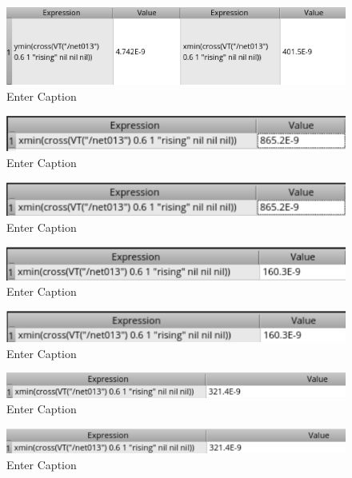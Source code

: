 \documentclass[12pt]{article}
\begin{document}
\begin{figure}[H]
    \centering
    \includegraphics[width=0.5\linewidth]{writeup//figures/wbuf1.png}
    \caption{Enter Caption}
\end{figure}

\begin{figure}[H]
    \centering
    \includegraphics[width=0.5\linewidth]{writeup//figures/optimized_wmux_value2.png}
    \caption{Enter Caption}
\end{figure}

\begin{figure}[H]
    \centering
    \includegraphics[width=0.5\linewidth]{writeup//figures/wmux2.png}
    \caption{Enter Caption}
\end{figure}

\begin{figure}[H]
    \centering
    \includegraphics[width=0.5\linewidth]{writeup//figures/optimized_wbuf_value2.png}
    \caption{Enter Caption}
\end{figure}

\begin{figure}[H]
    \centering
    \includegraphics[width=0.5\linewidth]{writeup//figures/wbuf2.png}
    \caption{Enter Caption}
\end{figure}

\begin{figure}[H]
    \centering
    \includegraphics[width=0.5\linewidth]{writeup//figures/optimized_wmux_value_3.png}
    \caption{Enter Caption}
\end{figure}

\begin{figure}[H]
    \centering
    \includegraphics[width=0.5\linewidth]{writeup//figures/wmux3.png}
    \caption{Enter Caption}
\end{figure}
\end{document}

